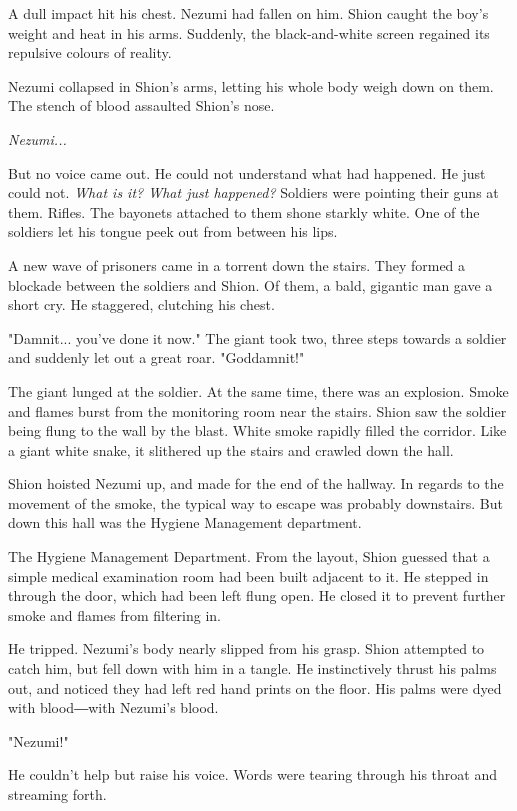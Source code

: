 A dull impact hit his chest. Nezumi had fallen on him. Shion caught the
boy's weight and heat in his arms. Suddenly, the black-and-white screen
regained its repulsive colours of reality.

Nezumi collapsed in Shion's arms, letting his whole body weigh down on
them. The stench of blood assaulted Shion's nose.

\emph{Nezumi...}

But no voice came out. He could not understand what had happened. He
just could not. \emph{What is it? What just happened?} Soldiers were pointing
their guns at them. Rifles. The bayonets attached to them shone starkly
white. One of the soldiers let his tongue peek out from between his
lips.

A new wave of prisoners came in a torrent down the stairs. They formed a
blockade between the soldiers and Shion. Of them, a bald, gigantic man
gave a short cry. He staggered, clutching his chest.

"Damnit... you've done it now." The giant took two, three steps towards
a soldier and suddenly let out a great roar. "Goddamnit!"

The giant lunged at the soldier. At the same time, there was an
explosion. Smoke and flames burst from the monitoring room near the
stairs. Shion saw the soldier being flung to the wall by the blast.
White smoke rapidly filled the corridor. Like a giant white snake, it
slithered up the stairs and crawled down the hall.

Shion hoisted Nezumi up, and made for the end of the hallway. In regards
to the movement of the smoke, the typical way to escape was probably
downstairs. But down this hall was the Hygiene Management department.

The Hygiene Management Department. From the layout, Shion guessed that a
simple medical examination room had been built adjacent to it. He
stepped in through the door, which had been left flung open. He closed
it to prevent further smoke and flames from filtering in.

He tripped. Nezumi's body nearly slipped from his grasp. Shion attempted
to catch him, but fell down with him in a tangle. He instinctively
thrust his palms out, and noticed they had left red hand prints on the
floor. His palms were dyed with blood―with Nezumi's blood.

"Nezumi!"

He couldn't help but raise his voice. Words were tearing through his
throat and streaming forth.

